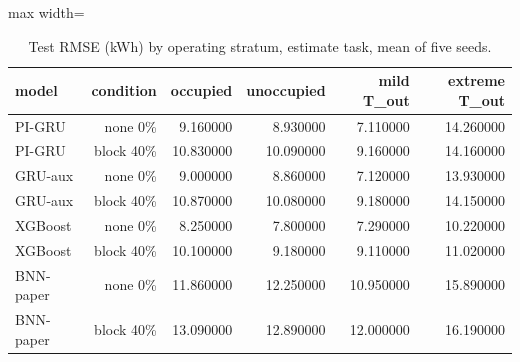 \begin{table}[H]
\centering\small
\caption{Test RMSE (kWh) by operating stratum, estimate task, mean of five seeds.}\label{tab:strata_estimate}
\begin{adjustbox}{max width=\textwidth}
\begin{tabular}{lrrrrr}
\toprule
model & condition & occupied & unoccupied & mild T\_out & extreme T\_out \\
\midrule
PI-GRU & none 0\% & 9.160000 & 8.930000 & 7.110000 & 14.260000 \\
PI-GRU & block 40\% & 10.830000 & 10.090000 & 9.160000 & 14.160000 \\
GRU-aux & none 0\% & 9.000000 & 8.860000 & 7.120000 & 13.930000 \\
GRU-aux & block 40\% & 10.870000 & 10.080000 & 9.180000 & 14.150000 \\
XGBoost & none 0\% & 8.250000 & 7.800000 & 7.290000 & 10.220000 \\
XGBoost & block 40\% & 10.100000 & 9.180000 & 9.110000 & 11.020000 \\
BNN-paper & none 0\% & 11.860000 & 12.250000 & 10.950000 & 15.890000 \\
BNN-paper & block 40\% & 13.090000 & 12.890000 & 12.000000 & 16.190000 \\
\bottomrule
\end{tabular}
\end{adjustbox}
\end{table}
